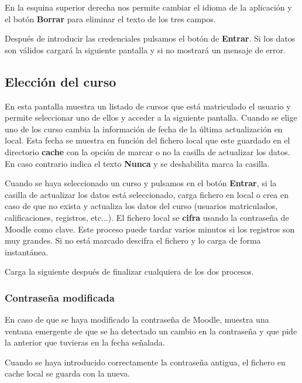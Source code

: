 En la esquina superior derecha nos permite cambiar el idioma de la aplicación y el botón \textbf{Borrar} para eliminar el texto de los tres campos. 

Después de introducir las credenciales pulsamos el botón de \textbf{Entrar}. Si los datos son válidos cargará la siguiente pantalla y si no mostrará un mensaje de error.


\subsection{Elección del curso}

En esta pantalla muestra un listado de cursos que está matriculado el usuario y permite seleccionar uno de ellos y acceder a la siguiente pantalla. Cuando se elige uno de los curso cambia la información de fecha de la última actualización en local. Esta fecha se muestra en función del fichero local que este guardado en el directorio \textbf{cache} con la opción de marcar o no la casilla de actualizar los datos. En caso contrario indica el texto \textbf{Nunca} y se deshabilita marca la casilla.



Cuando se haya seleccionado un curso y pulsamos en el botón \textbf{Entrar}, si la casilla de actualizar los datos está seleccionado, carga fichero en local o crea en caso de que no exista y actualiza los datos del curso (usuarios matriculados, calificaciones, registros, etc...). El fichero local se \textbf{cifra} usando la contraseña de Moodle como clave. Este proceso puede tardar varios minutos si los registros son muy grandes. Si no está marcado descifra el fichero y lo carga de forma instantánea. 

Carga la siguiente después de finalizar cualquiera de los dos procesos.

\subsubsection{Contraseña modificada}

En caso de que se haya modificado la contraseña de Moodle, muestra una ventana emergente de que se ha detectado un cambio en la contraseña y que pide la anterior que tuvieras en la fecha señalada.


Cuando se haya introducido correctamente la contraseña antigua, el fichero en cache local se guarda con la nueva.

